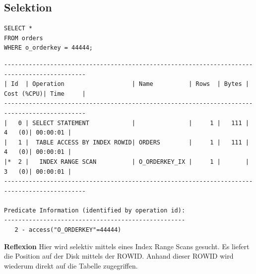 \documentclass[10pt]{article}
\begin{document}
\subsection{Selektion}
\begin{lstlisting}[style=sql]
SELECT *
FROM orders
WHERE o_orderkey = 44444;
\end{lstlisting}
\begin{lstlisting}[style=queryexecutionplan]
---------------------------------------------------------------------------------------------
| Id  | Operation                   | Name          | Rows  | Bytes | Cost (%CPU)| Time     |
---------------------------------------------------------------------------------------------
|   0 | SELECT STATEMENT            |               |     1 |   111 |     4   (0)| 00:00:01 |
|   1 |  TABLE ACCESS BY INDEX ROWID| ORDERS        |     1 |   111 |     4   (0)| 00:00:01 |
|*  2 |   INDEX RANGE SCAN          | O_ORDERKEY_IX |     1 |       |     3   (0)| 00:00:01 |
---------------------------------------------------------------------------------------------

Predicate Information (identified by operation id):
---------------------------------------------------
   2 - access("O_ORDERKEY"=44444)
\end{lstlisting}
\textbf{Reflexion} \newline
Hier wird selektiv mittels eines Index Range Scans gesucht. Es liefert die Position auf 
der Disk mittels der ROWID. Anhand dieser ROWID wird wiederum direkt auf die Tabelle 
zugegriffen.
\end{document}

